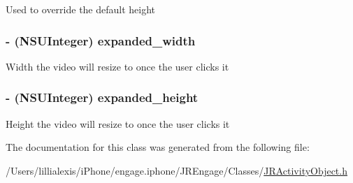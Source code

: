 \label{interface_j_r_flash_media_object_a0689e19fdf6cb9d3911878a95d6ebcc9}
Used to override the default height \hypertarget{interface_j_r_flash_media_object_a9c380d0410afa60d99442f4ab84b517c}{
\subsubsection[{expanded\_\-width}]{\setlength{\rightskip}{0pt plus 5cm}-\/ (NSUInteger) expanded\_\-width}}
\label{interface_j_r_flash_media_object_a9c380d0410afa60d99442f4ab84b517c}
Width the video will resize to once the user clicks it \hypertarget{interface_j_r_flash_media_object_ae390a89405d768f2fcc63c24a8271503}{
\subsubsection[{expanded\_\-height}]{\setlength{\rightskip}{0pt plus 5cm}-\/ (NSUInteger) expanded\_\-height}}
\label{interface_j_r_flash_media_object_ae390a89405d768f2fcc63c24a8271503}
Height the video will resize to once the user clicks it 

The documentation for this class was generated from the following file:\begin{DoxyCompactItemize}
\item 
/Users/lillialexis/iPhone/engage.iphone/JREngage/Classes/\hyperlink{_j_r_activity_object_8h}{JRActivityObject.h}\end{DoxyCompactItemize}
